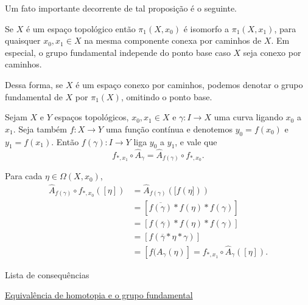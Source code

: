 Um fato importante decorrente de tal proposição é o seguinte.

\begin{corol}
    Se $X$ é um espaço topológico então $\pi_1(X,x_0)$ é isomorfo a $\pi_1(X,x_1)$, para quaisquer $x_0, x_1 \in X$ na mesma componente conexa por caminhos de $X$. Em especial, o grupo fundamental independe do ponto base caso $X$ seja conexo por caminhos.
\end{corol}

Dessa forma, se $X$ é um espaço conexo por caminhos, podemos denotar o grupo fundamental de $X$ por $\pi_1(X)$, omitindo o ponto base.

\begin{nota}
    Sejam $X$ e $Y$ espaços topológicos, $x_0, x_1\in X$ e $\gamma:I\to X$ uma curva ligando $x_0$ a $x_1$. Seja também $f: X\to Y$ uma função contínua e denotemos $y_0 = f(x_0)$ e $y_1 = f(x_1)$. Então $f(\gamma):I \to Y$ liga $y_0$ a $y_1$, e vale que
    \[f_{*,x_1} \circ \hat{A}_{\gamma} = \hat{A}_{f(\gamma)} \circ f_{*,x_0}.\]
    \begin{dem}
        Para cada $\eta \in \Omega(X,x_0)$,
        \begin{align*}
            \hat{A}_{f(\gamma)} \circ f_{*,x_0}([\eta])
            &= \hat{A}_{f(\gamma)} ([f(\eta]))\\
            &= [\overline{f(\gamma)} * f(\eta) * f(\gamma)]\\
            &= [f(\overline{\gamma}) * f(\eta) * f(\gamma)]\\
            &= [f(\overline{\gamma} * \eta * \gamma)]\\
            &= [f(A_{\gamma}(\eta)]
            = f_{*,x_1}\circ \hat{A}_{\gamma}([\eta]).
        \end{align*}
    \end{dem}
\end{nota}

\begin{titlemize}{Lista de consequências}
	\item \hyperref[equiv-homotopia-induz-iso]{Equivalência de homotopia e o grupo fundamental}%
\end{titlemize}

